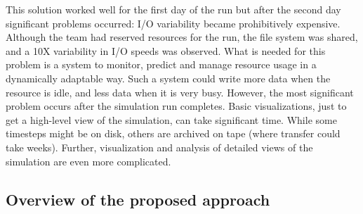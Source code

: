 This solution worked well for the first day of the run but after the second day significant problems occurred: I/O variability became prohibitively expensive. Although the team had reserved resources for the run, the file system was shared, and a 10X variability in I/O speeds was observed. What is needed for this problem is a system to monitor, predict and manage resource usage in a dynamically adaptable way. Such a system could write more data when the resource is idle, and less data when it is very busy. However, the most significant problem occurs after the simulation run completes. Basic visualizations, just to get a high-level view of the simulation, can take significant time. While some timesteps might be on disk, others are archived on tape (where transfer could take weeks). Further, visualization and analysis of detailed views of the simulation are even more complicated.


\subsection{Overview of the proposed approach} 


